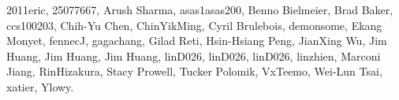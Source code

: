 2011eric,            %
25077667,            %
Arush Sharma,        %
asas1asas200,        %
Benno Bielmeier,     %
Brad Baker,          %
ccs100203,           %
Chih-Yu Chen,        %
ChinYikMing,         %
Cyril Brulebois,     %
demonsome,           %
Ekang Monyet,        %
fennecJ,             %
gagachang,           %
Gilad Reti,          %
Hsin-Hsiang Peng,    %
JianXing Wu,         %
Jim Huang,           %
Jim Huang,           %
Jim Huang,           %
linD026,             %
linD026,             %
linD026,             %
linzhien,            %
Marconi Jiang,       %
RinHizakura,         %
Stacy Prowell,       %
Tucker Polomik,      %
VxTeemo,             %
Wei-Lun Tsai,        %
xatier,              %
Ylowy.               %
